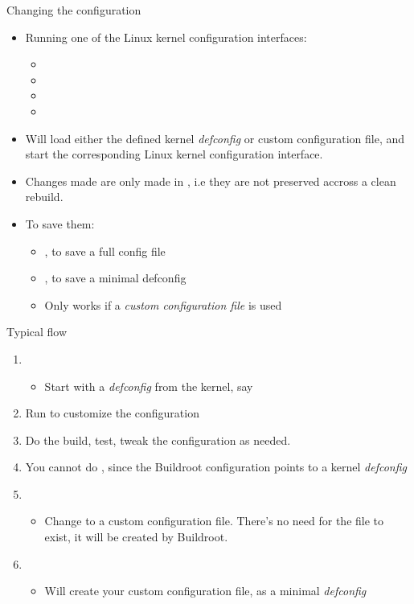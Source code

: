 \begin{frame}{Changing the configuration}
  \begin{itemize}
  \item Running one of the Linux kernel configuration interfaces:
    \begin{itemize}
    \item {}
    \item {}
    \item {}
    \item {}
    \end{itemize}
  \item Will load either the defined kernel {\em defconfig} or custom
    configuration file, and start the corresponding Linux kernel
    configuration interface.
  \item Changes made are only made in
    , i.e they are not preserved
    accross a clean rebuild.
  \item To save them:
    \begin{itemize}
    \item {}, to save a full config file
    \item {}, to save a minimal defconfig
    \item Only works if a {\em custom configuration file} is used
    \end{itemize}
  \end{itemize}
\end{frame}

\begin{frame}{Typical flow}
  \begin{enumerate}
  \item {}
    \begin{itemize}
    \item Start with a {\em defconfig} from the kernel, say 
    \end{itemize}
  \item Run  to customize the
    configuration
  \item Do the build, test, tweak the configuration as needed.
  \item You cannot do ,
    since the Buildroot configuration points to a kernel {\em
      defconfig}
  \item {}
    \begin{itemize}
    \item Change to a custom configuration file. There's no need for
      the file to exist, it will be created by Buildroot.
    \end{itemize}
  \item {}
    \begin{itemize}
    \item Will create your custom configuration file, as a minimal
      {\em defconfig}
    \end{itemize}
  \end{enumerate}
\end{frame}
